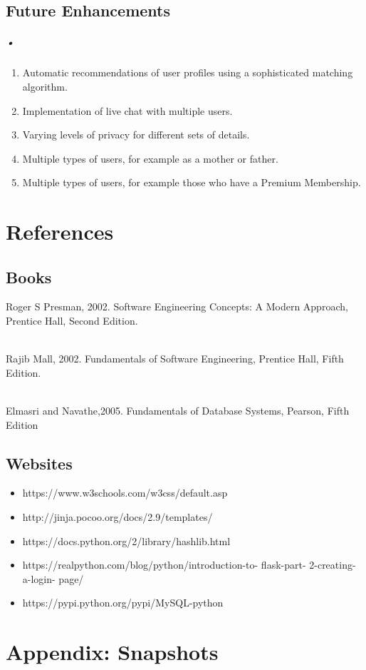 \documentclass[12pt]{report}
\begin{document}
\section{Future Enhancements}
\paragraph*{•}
 
\begin{enumerate}
\item Automatic recommendations of user profiles using a sophisticated matching algorithm.  
\item Implementation of live chat with multiple users.
\item Varying levels of privacy for different sets of details.
\item Multiple types of users, for example as a mother or father.
\item Multiple types of users, for example those who have a Premium Membership. 

\end{enumerate}

\chapter{References} 

\section{Books}
\noindent [1] Roger S Presman, 2002. Software Engineering Concepts: A Modern Approach, Prentice Hall, Second Edition. \\\

\noindent [2] Rajib Mall, 2002. Fundamentals of Software Engineering, Prentice Hall, Fifth Edition. \\\

\noindent [3] Elmasri and Navathe,2005. Fundamentals of Database Systems, Pearson, Fifth Edition


\section{Websites}

\begin{itemize}
\item https://www.w3schools.com/w3css/default.asp
\item http://jinja.pocoo.org/docs/2.9/templates/
\item https://docs.python.org/2/library/hashlib.html
\item https://realpython.com/blog/python/introduction-to- flask-part- 2-creating- a-login-
page/
\item https://pypi.python.org/pypi/MySQL-python
\end{itemize}

\chapter{Appendix: Snapshots} 
\end{document}
